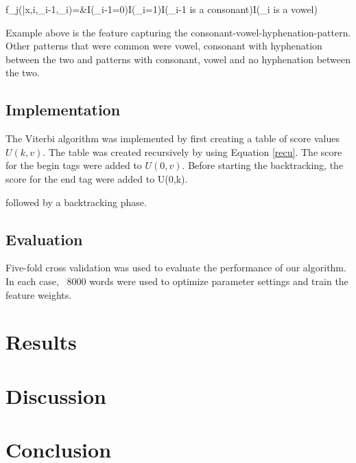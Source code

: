 \documentclass[10pt,twocolumn,letterpaper]{article}
\newcommand{\x}{\mathbf{x}}
\newcommand{\y}{\mathbf{y}}
\begin{document}
f_j(\bar{x},i,\y_{i-1},\y_i)=&I(\y_{i-1}=0)I(\y_i=1)I(\x_{i-1} is a consonant)I(\x_{i} is a vowel)

Example above is the feature capturing the consonant-vowel-hyphenation-pattern. Other patterns that were common were vowel, consonant with hyphenation between the two and patterns with consonant, vowel and no hyphenation between the two.

\subsection{Implementation}

The Viterbi algorithm was implemented by first creating a table of score values $U(k,v)$. The table was created recursively by using Equation \ref{recu}. The score for the begin tags were added to $U(0,v)$. Before starting the backtracking, the score for the end tag were added to U(0,k).


 followed by a backtracking phase.


\subsection{Evaluation}
Five-fold cross validation was used to evaluate the performance of our algorithm.  In each case, ~8000 words were used to optimize parameter settings and train the feature weights. 



\section{Results}
\section{Discussion}
\section{Conclusion}



{\small


}
\end{document}
